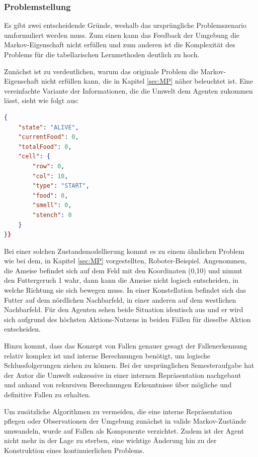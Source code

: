 \subsubsection{Problemstellung}
Es gibt zwei entscheidende Gründe, weshalb das ursprüngliche Problemszenario umformuliert werden muss. Zum einen kann das Feedback der Umgebung die Markov-Eigenschaft nicht erfüllen und zum anderen ist die Komplexität des Problems für die tabellarischen Lernmethoden deutlich zu hoch.
\par
Zunächst ist zu verdeutlichen, warum das originale Problem die Markov-Eigenschaft nicht erfüllen kann, die in Kapitel \ref{sec:MP} näher beleuchtet ist. Eine vereinfachte Variante der Informationen, die die Umwelt dem Agenten zukommen lässt, sieht wie folgt aus:
\begin{lstlisting}[language=json,firstnumber=1, label=lst:ursprüngliche Wahrnehmung,caption=Wahrnehmung des Agenten bei dem ursprünglichen Problem]
{
    "state": "ALIVE",
    "currentFood": 0,
    "totalFood": 0,
    "cell": {
        "row": 0,
        "col": 10,
        "type": "START",
        "food": 0,
        "smell": 0,
        "stench": 0
    }
}}
\end{lstlisting}
Bei einer solchen Zustandsmodellierung kommt es zu einem ähnlichen Problem wie bei dem, in Kapitel \ref{sec:MP} vorgestellten, Roboter-Beispiel. Angenommen, die Ameise befindet sich auf dem Feld mit den Koordinaten (0,10) und nimmt den Futtergeruch 1 wahr, dann kann die Ameise nicht logisch entscheiden, in welche Richtung sie sich bewegen muss. In einer Konstellation befindet sich das Futter auf dem nördlichen Nachbarfeld, in einer anderen auf dem westlichen Nachbarfeld. Für den Agenten sehen beide Situation identisch aus und er wird sich aufgrund des höchsten Aktions-Nutzens in beiden Fällen für dieselbe Aktion entscheiden.
\par 
Hinzu kommt, dass das Konzept von Fallen genauer gesagt der Fallenerkennung relativ komplex ist und interne Berechnungen benötigt, um logische Schlussfolgerungen ziehen zu können. Bei der ursprünglichen Semesteraufgabe hat der Autor die Umwelt sukzessive in einer internen Repräsentation nachgebaut und anhand von rekursiven Berechnungen Erkenntnisse über mögliche und definitive Fallen zu erhalten.
\par 
Um zusätzliche Algorithmen zu vermeiden, die eine interne Repräsentation pflegen oder Observationen der Umgebung zunächst in valide Markov-Zustände umwandeln, wurde  
auf Fallen als Komponente verzichtet. Zudem ist der Agent nicht mehr in der Lage zu sterben, eine wichtige Änderung hin zu der Konstruktion eines kontinuierlichen Problems.   
